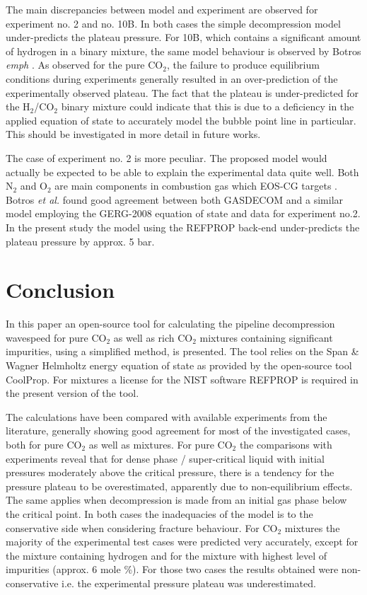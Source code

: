 \documentclass[a4paper, 10pt, twocolumn, twoside]{scrartcl}
\begin{document}
The main discrepancies between model and experiment are observed for experiment no. 2 and no. 10B. In both cases the simple decompression model under-predicts the plateau pressure. For 10B, which contains a significant amount of hydrogen in a binary mixture, the same model behaviour is observed by Botros \emph{emph} \cite{Botros_mixture}. As observed for the pure CO$_2$, the failure to produce equilibrium conditions during experiments generally resulted in an over-prediction of the experimentally observed plateau. The fact that the plateau is under-predicted for the H$_2$/CO$_2$ binary mixture could indicate that this is due to a deficiency in the applied equation of state to accurately model the bubble point line in particular. This should be investigated in more detail in future works. 

The case of experiment no. 2 is more peculiar. The proposed model would actually be expected to be able to explain the experimental data quite well. Both N$_2$ and O$_2$ are main components in combustion gas which EOS-CG targets \cite{Gernert2016,Herrig2018}. Botros \emph{et al.} found good agreement between both GASDECOM \cite{Cosham_GASDECOM} and a similar model employing the GERG-2008 equation of state \cite{Kunz2012} and data for experiment no.2. In the present study the model using the REFPROP back-end under-predicts the plateau pressure by approx. 5 bar.   

\section{Conclusion}
In this paper an open-source tool for calculating the pipeline decompression wavespeed for pure CO$_2$ as well as rich CO$_2$ mixtures containing significant impurities, using a simplified method, is presented. The tool relies on the Span \& Wagner Helmholtz energy equation of state as provided by the open-source tool CoolProp. For mixtures a license for the NIST software REFPROP is required in the present version of the tool. 

The calculations have been compared with available experiments from the literature, generally showing good agreement for most of the investigated cases, both for pure CO$_2$ as well as mixtures. For pure CO$_2$ the comparisons with experiments reveal that for dense phase / super-critical liquid with initial pressures moderately above the critical pressure, there is a tendency for the pressure plateau to be overestimated, apparently due to non-equilibrium effects. The same applies when decompression is made from an initial gas phase below the critical point.  In both cases the inadequacies of the model is to the conservative side when considering fracture behaviour. For CO$_2$ mixtures the majority of the experimental test cases were predicted very accurately, except for the mixture containing hydrogen and for the mixture with highest level of impurities (approx. 6 mole \%). For those two cases the results obtained were non-conservative i.e. the experimental pressure plateau was underestimated. 
\end{document}
